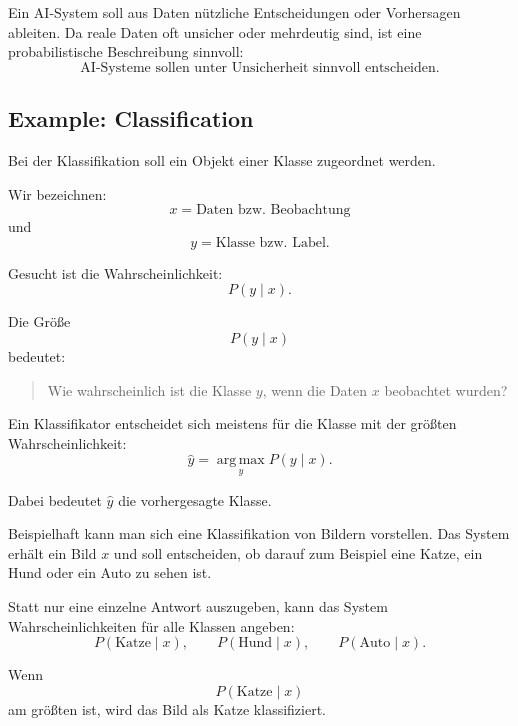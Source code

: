 \documentclass[11pt,a4paper]{scrartcl}
\newcommand{\argmax}{\operatorname*{arg\,max}}
\begin{document}
\begin{answerbox}
    Ein AI-System soll aus Daten nützliche Entscheidungen oder Vorhersagen
    ableiten. Da reale Daten oft unsicher oder mehrdeutig sind, ist eine
    probabilistische Beschreibung sinnvoll:
    \[
        \boxed{
            \text{AI-Systeme sollen unter Unsicherheit sinnvoll entscheiden.}
        }
    \]
\end{answerbox}

\subsection{Example: Classification}

\begin{notebox}
    Bei der Klassifikation soll ein Objekt einer Klasse zugeordnet werden.

    Wir bezeichnen:
    \[
        x = \text{Daten bzw. Beobachtung}
    \]
    und
    \[
        y = \text{Klasse bzw. Label}.
    \]

    Gesucht ist die Wahrscheinlichkeit:
    \[
        P(y \mid x).
    \]
\end{notebox}

\begin{calculationbox}
    Die Größe
    \[
        P(y \mid x)
    \]
    bedeutet:

    \begin{quote}
        Wie wahrscheinlich ist die Klasse \(y\), wenn die Daten \(x\)
        beobachtet wurden?
    \end{quote}

    Ein Klassifikator entscheidet sich meistens für die Klasse mit der größten
    Wahrscheinlichkeit:
    \[
        \hat y = \argmax_y P(y \mid x).
    \]

    Dabei bedeutet \(\hat y\) die vorhergesagte Klasse.
\end{calculationbox}

\begin{solutionbox}
    Beispielhaft kann man sich eine Klassifikation von Bildern vorstellen.
    Das System erhält ein Bild \(x\) und soll entscheiden, ob darauf zum Beispiel
    eine Katze, ein Hund oder ein Auto zu sehen ist.

    Statt nur eine einzelne Antwort auszugeben, kann das System Wahrscheinlichkeiten
    für alle Klassen angeben:
    \[
        P(\text{Katze} \mid x),
        \qquad
        P(\text{Hund} \mid x),
        \qquad
        P(\text{Auto} \mid x).
    \]

    Wenn
    \[
        P(\text{Katze} \mid x)
    \]
    am größten ist, wird das Bild als Katze klassifiziert.
\end{solutionbox}
\end{document}
